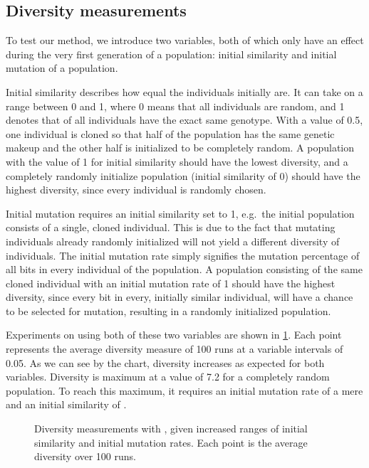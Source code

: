 \subsection{Diversity measurements}
To test our \dia{} method, we introduce two variables, both of which only have an effect during the very first generation of a population: initial similarity and initial mutation of a population. 

Initial similarity describes how equal the individuals initially are. It can take on a range between \num{0} and \num{1}, where \num{0} means that all individuals are random, and \num{1} denotes that  of all individuals have the exact same genotype. With a value of \num{0.5}, one individual is cloned so that half of the population has the same genetic makeup and the other half is initialized to be completely random. A population with the value of \num{1} for initial similarity should have the lowest diversity, and a completely randomly initialize population (initial similarity of \num{0}) should have the highest diversity, since every individual is randomly chosen.

Initial mutation requires an initial similarity set to \num{1}, e.g.\ the initial population consists of a single, cloned individual. This is due to the fact that mutating individuals already randomly initialized will not yield a different diversity of individuals. The initial mutation rate simply signifies the mutation percentage of all bits in every individual of the population. A population consisting of the same cloned individual with an initial mutation rate of \num{1} should have the highest diversity, since every bit in every, initially similar individual, will have a  chance to be selected for mutation, resulting in a randomly initialized population.

Experiments on \dia{} using both of these two variables are shown in \cref{fig:initial-mutation-similarity}. Each point represents the average diversity measure of \num{100} runs at a variable intervals of \num{0.05}. As we can see by the chart, diversity increases as expected for both variables. Diversity is maximum at a value of \num{7.2} for a completely random population. To reach this maximum, it requires an initial mutation rate of a mere  and an initial similarity of .

\begin{figure}[htpb]
  \centering
  \caption{Diversity measurements with \dia{}, given increased ranges of initial similarity and initial mutation rates. Each point is the average diversity over \num{100} runs.}\label{fig:initial-mutation-similarity}
\end{figure}
